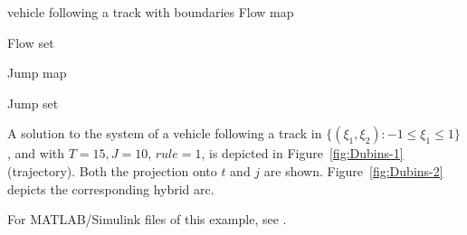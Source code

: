 \begin{example}{vehicle following a track with boundaries}
Flow map
\label{scr:f}

Flow set
\label{scr:C}

Jump map
\label{scr:g}

Jump set
\label{scr:D}


A solution to the system of a vehicle following a track in $\{(\xi_1,\xi_2):-1\leq \xi_1 \leq1\}$, and with
$T=15, J=10$, $rule =1$, is depicted in Figure~\ref{fig:Dubins-1} (trajectory).  Both the
projection onto $t$ and $j$ are shown. Figure~\ref{fig:Dubins-2} depicts the corresponding
hybrid arc.

For MATLAB/Simulink files of this example, see .

\end{example}

